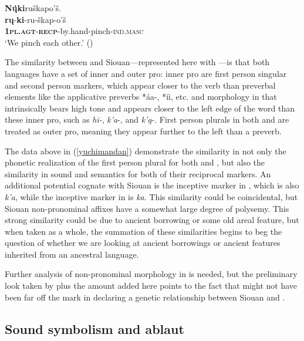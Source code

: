 \documentclass[output=paper]{LSP/langsci}
\begin{document}
	\ex  
	\glll \textbf{N\k{\'u}ki}ru\v{s}kapo'\v{s}. \\ 
	\textbf{r\k{u}}-\textbf{ki}-ru-\v{s}kap-o'\v{s}\\
			\textbf{\textsc{1pl.agt}}-\textbf{\textsc{recp}}-by.hand-pinch-\textsc{ind.masc}\\ 
	\glt `We pinch each other.' (\citealt[440]{Hollow1970})
\z
\z

The similarity between  and Siouan---represented here with ---is that both languages have a set of inner and outer pro: inner pro are first person singular and second person markers, which appear closer to the verb than preverbal elements like the  applicative preverbs *\'aa-, *\'ii, etc. and morphology in  that intrinsically bears high tone and appears closer to the left edge of the word than these inner pro, such as \emph{hi-}, \emph{k'a}-, and \emph{k'\k{a}}-. First person plurals in both  and  are treated as outer pro, meaning they appear further to the left than a preverb.

The data above in (\ref{yuchimandan}) demonstrate the similarity in not only the phonetic realization of the first person plural for both  and , but also the similarity in sound and semantics for both of their reciprocal markers. An additional potential cognate with Siouan is the inceptive marker in , which is also \emph{k'a}, while the inceptive marker in  is \emph{ka}. This similarity could be coincidental, but Siouan non-pronominal affixes have a somewhat large degree of polysemy.  This strong similarity could be due to ancient borrowing or some old areal feature, but when taken as a whole, the summation of these similarities begins to beg the question of whether we are looking at ancient borrowings or ancient features inherited from an ancestral language. 

Further analysis of non-pronominal morphology in  is needed, but the preliminary look taken by \citet{Rankin1998scy} plus the amount added here points to the fact that \citet{Sapir1929} might not have been far off the mark in declaring a genetic relationship between Siouan and .

\subsection{Sound symbolism and ablaut}
\end{document}
